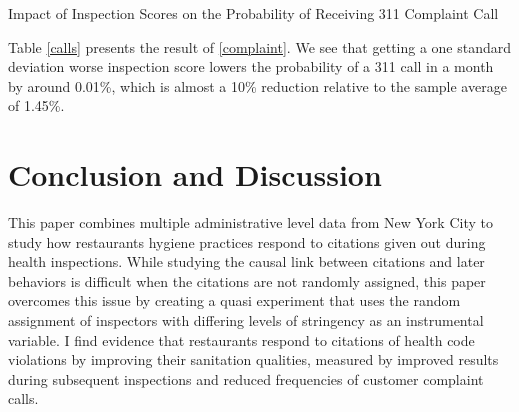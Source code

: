 \documentclass[10pt]{article} %
\begin{document}
\begin{table}[htbp]
\centering
\scalebox{0.68}{}
\caption{Impact of Inspection Scores on the Probability of Receiving 311 Complaint Call}
\label{calls}
\label{complaint_table}
\end{table}

Table \ref{calls} presents the result of \eqref{complaint}. We see that getting a one standard deviation worse inspection score lowers the probability of a 311 call in a month by around 0.01\%, which is almost a 10\% reduction relative to the sample average of 1.45\%.  


\section{Conclusion and Discussion}

This paper combines multiple administrative level data from New York City to study how restaurants hygiene practices respond to citations given out during health inspections. While studying the causal link between citations and later behaviors is difficult when the citations are not randomly assigned, this paper overcomes this issue by creating a quasi experiment that uses the random assignment of inspectors with differing levels of stringency as an instrumental variable. I find evidence that restaurants respond to citations of health code violations by improving their sanitation qualities, measured by improved results during subsequent inspections and reduced frequencies of customer complaint calls.





\end{document}
